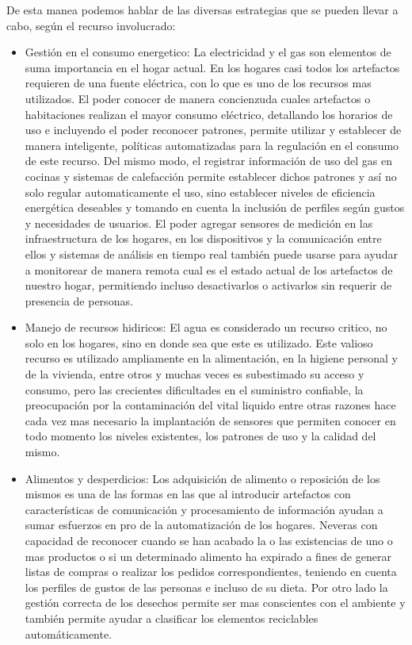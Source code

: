 De esta manea podemos hablar de las diversas estrategias que se pueden llevar a cabo, según el recurso involucrado:
\begin{itemize}
\item Gestión en el consumo energetico: La electricidad y el gas son elementos de suma importancia en el hogar actual. En los hogares casi todos los artefactos requieren de una fuente eléctrica, con lo que es uno de los recursos mas utilizados. El poder conocer de manera concienzuda cuales artefactos o habitaciones realizan el mayor consumo eléctrico, detallando los horarios de uso e incluyendo el poder reconocer patrones, permite utilizar y establecer de manera inteligente, políticas automatizadas para la regulación en el consumo de este recurso. Del mismo modo, el registrar información de uso del gas en cocinas y sistemas de calefacción permite establecer dichos patrones  y así no solo regular automaticamente el uso, sino establecer niveles de eficiencia energética deseables y tomando en cuenta la inclusión de perfiles según gustos y necesidades de usuarios. El poder agregar sensores de medición en las infraestructura de los hogares, en los dispositivos y la comunicación entre ellos y sistemas de análisis en tiempo real también puede usarse para ayudar a monitorear de manera remota cual es el estado actual de los artefactos de nuestro hogar, permitiendo incluso desactivarlos o activarlos sin requerir de presencia de personas. 
\item Manejo de recursos hidiricos: El agua es considerado un recurso critico, no solo en los hogares, sino en donde sea que este es utilizado. Este valioso recurso es utilizado ampliamente en la alimentación, en la higiene personal y de la vivienda, entre otros y muchas veces es subestimado su acceso y consumo, pero las crecientes dificultades en el suministro confiable, la preocupación por la contaminación del vital liquido entre otras razones hace cada vez mas necesario la implantación de sensores que permiten conocer en todo momento los niveles existentes, los patrones de uso y la calidad del mismo. 
\item Alimentos y desperdicios: Los adquisición de alimento o reposición de los mismos es una de las formas en las que al introducir artefactos con características de comunicación y procesamiento de información ayudan a sumar esfuerzos en pro de la automatización de los hogares. Neveras con capacidad de reconocer cuando se han acabado la o las existencias de uno o mas productos o si un determinado alimento ha expirado a fines de generar listas de compras o realizar los pedidos correspondientes, teniendo en cuenta los perfiles de gustos de las personas e incluso de su dieta. Por otro lado la gestión correcta de los desechos permite ser mas conscientes con el ambiente y también permite ayudar a clasificar los elementos reciclables automáticamente.
\end{itemize}

